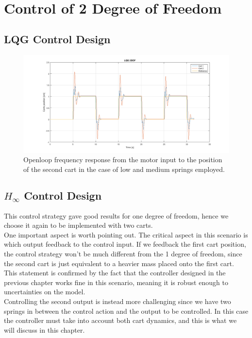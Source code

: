 \chapter{Control of 2 Degree of Freedom}

\section{LQG Control Design}

\begin{figure}[h]
\centering
\includegraphics[width=0.5\linewidth]{img/lqg_2dof.png}
\caption{Openloop frequency response from the motor input to the position of the second cart in the case of low and medium springs employed.}
\label{fig:lqg2dof}
\end{figure}
\section{$H_\infty$ Control Design}
This control strategy gave good results for one degree of freedom, hence we choose it again to be implemented with two carts.\\

One important aspect is worth pointing out. The critical aspect in this scenario is which output feedback to the control input. If we feedback the first cart position, the control strategy won't be much different from the 1 degree of freedom, since the second cart is just equivalent to a heavier mass placed onto the first cart. This statement is confirmed by the fact that the controller designed in the previous chapter works fine in this scenario, meaning it is robust enough to uncertainties on the model.\\

Controlling the second output is instead more challenging since we have two springs in between the control action and the output to be controlled. In this case the controller must take into account both cart dynamics, and this is what we will discuss in this chapter.\\


